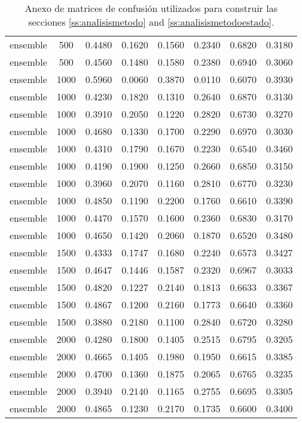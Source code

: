 \begin{table}[h!]
\begin{tabularx}{\textwidth}{cccccccc}
		ensemble & 500  & 0.4480 & 0.1620 & 0.1560 & 0.2340 & 0.6820 & 0.3180 \\
		ensemble & 500  & 0.4560 & 0.1480 & 0.1580 & 0.2380 & 0.6940 & 0.3060 \\
		ensemble & 1000 & 0.5960 & 0.0060 & 0.3870 & 0.0110 & 0.6070 & 0.3930 \\
		ensemble & 1000 & 0.4230 & 0.1820 & 0.1310 & 0.2640 & 0.6870 & 0.3130 \\
		ensemble & 1000 & 0.3910 & 0.2050 & 0.1220 & 0.2820 & 0.6730 & 0.3270 \\
		ensemble & 1000 & 0.4680 & 0.1330 & 0.1700 & 0.2290 & 0.6970 & 0.3030 \\
		ensemble & 1000 & 0.4310 & 0.1790 & 0.1670 & 0.2230 & 0.6540 & 0.3460 \\
		ensemble & 1000 & 0.4190 & 0.1900 & 0.1250 & 0.2660 & 0.6850 & 0.3150 \\
		ensemble & 1000 & 0.3960 & 0.2070 & 0.1160 & 0.2810 & 0.6770 & 0.3230 \\
		ensemble & 1000 & 0.4850 & 0.1190 & 0.2200 & 0.1760 & 0.6610 & 0.3390 \\
		ensemble & 1000 & 0.4470 & 0.1570 & 0.1600 & 0.2360 & 0.6830 & 0.3170 \\
		ensemble & 1000 & 0.4650 & 0.1420 & 0.2060 & 0.1870 & 0.6520 & 0.3480 \\
		ensemble & 1500 & 0.4333 & 0.1747 & 0.1680 & 0.2240 & 0.6573 & 0.3427 \\
		ensemble & 1500 & 0.4647 & 0.1446 & 0.1587 & 0.2320 & 0.6967 & 0.3033 \\
		ensemble & 1500 & 0.4820 & 0.1227 & 0.2140 & 0.1813 & 0.6633 & 0.3367 \\
		ensemble & 1500 & 0.4867 & 0.1200 & 0.2160 & 0.1773 & 0.6640 & 0.3360 \\
		ensemble & 1500 & 0.3880 & 0.2180 & 0.1100 & 0.2840 & 0.6720 & 0.3280 \\
		ensemble & 2000 & 0.4280 & 0.1800 & 0.1405 & 0.2515 & 0.6795 & 0.3205 \\
		ensemble & 2000 & 0.4665 & 0.1405 & 0.1980 & 0.1950 & 0.6615 & 0.3385 \\
		ensemble & 2000 & 0.4700 & 0.1360 & 0.1875 & 0.2065 & 0.6765 & 0.3235 \\
		ensemble & 2000 & 0.3940 & 0.2140 & 0.1165 & 0.2755 & 0.6695 & 0.3305 \\
		ensemble & 2000 & 0.4865 & 0.1230 & 0.2170 & 0.1735 & 0.6600 & 0.3400 \\
		\bottomrule
	\end{tabularx}
	\caption{Anexo de matrices de confusión utilizados para construir las secciones \ref{ss:analisismetodo} and \ref{ss:analisismetodoestado}.}
	\label{tab:anexo-confusion}
\end{table}

